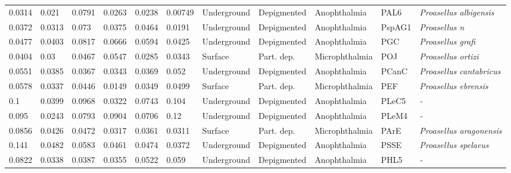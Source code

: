 \begin{tabular}{lllllllllll}
        0.0314 &               0.021 &         0.0791 &         0.0263 &         0.0238 &        0.00749 &  Underground &  Depigmented &     Anophthalmia &     PAL6 &           \textit{Proasellus albigensis} \\
        0.0372 &              0.0313 &          0.073 &         0.0375 &         0.0464 &         0.0191 &  Underground &  Depigmented &     Anophthalmia &   PspAG1 &                    \textit{Proasellus n} \\
        0.0477 &              0.0403 &         0.0817 &         0.0666 &         0.0594 &         0.0425 &  Underground &  Depigmented &     Anophthalmia &      PGC &                \textit{Proasellus grafi} \\
        0.0404 &                0.03 &         0.0467 &         0.0547 &         0.0285 &         0.0343 &      Surface &   Part. dep. &   Microphthalmia &      POJ &               \textit{Proasellus ortizi} \\
        0.0551 &              0.0385 &         0.0367 &         0.0343 &         0.0369 &          0.052 &  Underground &  Depigmented &     Anophthalmia &    PCanC &          \textit{Proasellus cantabricus} \\
        0.0578 &              0.0337 &         0.0446 &         0.0149 &         0.0349 &         0.0499 &      Surface &   Part. dep. &   Microphthalmia &      PEF &             \textit{Proasellus ebrensis} \\
           0.1 &              0.0399 &         0.0968 &         0.0322 &         0.0743 &          0.104 &  Underground &  Depigmented &     Anophthalmia &    PLeC5 &                               \textit{-} \\
         0.095 &              0.0243 &         0.0793 &         0.0904 &         0.0706 &           0.12 &  Underground &  Depigmented &     Anophthalmia &    PLeM4 &                               \textit{-} \\
        0.0856 &              0.0426 &         0.0472 &         0.0317 &         0.0361 &         0.0311 &      Surface &   Part. dep. &   Microphthalmia &     PArE &          \textit{Proasellus aragonensis} \\
         0.141 &              0.0482 &         0.0583 &         0.0461 &         0.0474 &         0.0372 &  Underground &  Depigmented &     Anophthalmia &     PSSE &             \textit{Proasellus spelaeus} \\
        0.0822 &              0.0338 &         0.0387 &         0.0355 &         0.0522 &          0.059 &  Underground &  Depigmented &     Anophthalmia &     PHL5 &                               \textit{-} \\

\end{tabular}
